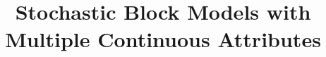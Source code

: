 \documentclass[10pt,journal,compsoc]{IEEEtran}
\begin{document}
%
\title{Stochastic Block Models with Multiple Continuous Attributes}
%
%
%
%
\end{document}
